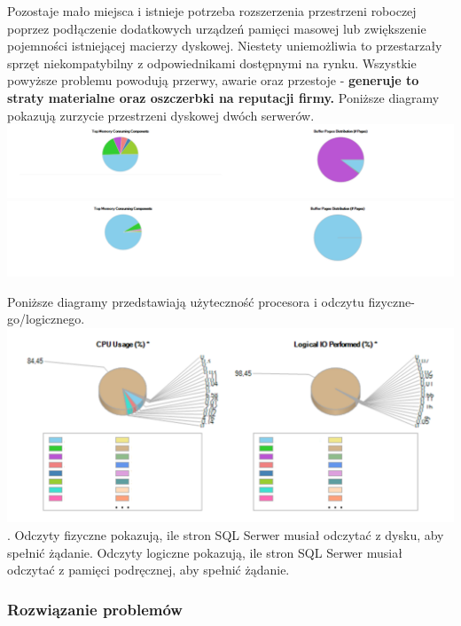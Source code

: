 \documentclass[a4paper, 12pt]{article}
\begin{document}
			 	\hspace*{1cm} Pozostaje mało miejsca i istnieje potrzeba rozszerzenia przestrzeni roboczej poprzez podłączenie dodatkowych urządzeń pamięci masowej lub zwiększenie pojemności istniejącej macierzy dyskowej. Niestety uniemożliwia to przestarzały sprzęt niekompatybilny z odpowiednikami dostępnymi na rynku.\newline
			\hspace*{1cm}  Wszystkie powyższe problemu powodują przerwy, awarie oraz  przestoje - \textbf{generuje to straty materialne oraz oszczerbki na reputacji firmy.}\newline
			Poniższe diagramy pokazują zurzycie przestrzeni dyskowej dwóch serwerów.\newline
			\includegraphics[width=1.1\textwidth]{diagram_dyski_1}
			\includegraphics[width=1.1\textwidth]{diagram_dyski_2}
			
			Poniższe diagramy przedstawiają użyteczność procesora i odczytu fizyczne-go/logicznego.
			  \includegraphics[width=1.0\textwidth]{diagram}. \newline
			\hspace*{1cm} Odczyty fizyczne pokazują, ile stron SQL Serwer musiał odczytać z dysku, aby spełnić żądanie. Odczyty logiczne pokazują, ile stron SQL Serwer musiał odczytać z pamięci podręcznej, aby spełnić żądanie. 
			\subsubsection{Rozwiązanie problemów}
\end{document}
